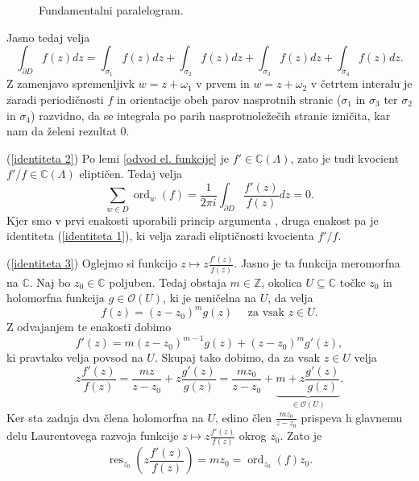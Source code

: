 \documentclass[mat1]{fmfdelo}
\numberwithin{equation}{section}
\newcommand{\Z}{\mathbb Z}
\newcommand{\C}{\mathbb C}
\newcommand{\om}{\omega}
\newcommand{\elf}{\C(\Lambda)}
\newcommand{\ord}[2]{\operatorname{ord}_{#1}(#2)}
\newcommand{\hol}[1]{\mathcal{O}(#1)}
\theoremstyle{definition}
\begin{document}
\begin{dokaz}
\begin{figure}[H]
        \caption{Fundamentalni paralelogram.}
        \label{fundamentalni paralelogram}
    \end{figure}


    Jasno tedaj velja
    \[
        \int_{\partial D} f(z)dz = \int_{\sigma_1} f(z)dz + \int_{\sigma_2} f(z)dz + \int_{\sigma_3} f(z)dz + \int_{\sigma_4} f(z)dz.
    \]
    Z zamenjavo spremenljivk $w = z + \om_1$ v prvem in $w = z + \om_2$ v četrtem interalu je zaradi periodičnosti $f$ in orientacije obeh parov nasprotnih stranic ($\sigma_1$ in $\sigma_3$ ter $\sigma_2$ in $\sigma_4$) razvidno, da se integrala po parih nasprotnoležečih stranic izničita, kar nam da želeni rezultat $0$.
    \\
    \par
    (\ref{identiteta 2}) Po lemi \ref{odvod el. funkcije} je $f' \in \elf$, zato je tudi kvocient $f'/f \in \elf$ eliptičen. Tedaj velja
    \[
        \sum_{w \in D} \ord{w}{f} = \frac{1}{2\pi i}\int_{\partial D} \frac{f'(z)}{f(z)}dz = 0. 
    \]
    Kjer smo v prvi enakosti uporabili princip argumenta \cite[Izrek 72]{Globevnik}, druga enakost pa je identiteta (\ref{identiteta 1}), ki velja zaradi eliptičnosti kvocienta $f'/f$.
    \\
    \par
    (\ref{identiteta 3}) Oglejmo si funkcijo $z \mapsto z \frac{f'(z)}{f(z)}$. Jasno je ta funkcija meromorfna na $\C$. Naj bo $z_0 \in \C$ poljuben. Tedaj obstaja $m \in \Z$, okolica $U \subseteq \C$ točke $z_0$ in holomorfna funkcija $g \in \hol{U}$, ki je neničelna na $U$, da velja
    \[
        f(z) = (z - z_0)^m g(z) \quad \text{ za vsak $z \in U$.}  
    \]
    Z odvajanjem te enakosti dobimo
    \[
        f'(z) = m(z - z_0)^{m - 1} g(z) + (z - z_0)^m g'(z),
    \]
    ki pravtako velja povsod na $U$. Skupaj tako dobimo, da za vsak $z \in U$ velja
    \[
        z\frac{f'(z)}{f(z)} = \frac{mz}{z-z_0} + z\frac{g'(z)}{g(z)} = \frac{mz_0}{z-z_0} + \underbrace{m + z\frac{g'(z)}{g(z)}}_{\in \hol{U}}.
    \]
    Ker sta zadnja dva člena holomorfna na $U$, edino člen $\frac{mz_0}{z-z_0}$ prispeva h glavnemu delu Laurentovega razvoja funkcije $z \mapsto z \frac{f'(z)}{f(z)}$ okrog $z_0$. Zato je 
    \[
        \operatorname{res}_{z_0} \left( z \frac{f'(z)}{f(z)} \right) = mz_0 = \ord{z_0}{f}z_0.  
\]
\end{dokaz}
\end{document}
